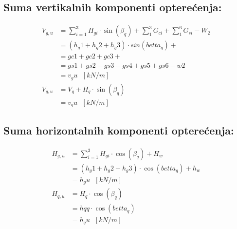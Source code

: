 \documentclass[a4paper, 11pt]{article}
\begin{document}
\subsection*{Suma vertikalnih komponenti optere\'cenja:}

\begin{align*}
V_{g,u} &= \sum_{i=1}^{3} H_{gi} \cdot \sin(\beta_{q}) + \sum_{1}^3 {G_{ci}} + \sum_{1}^{6} {G_{si}} -W_{2} \\
		&= \left( h_g1 + h_g2 + h_g3 \right) \cdot sin(betta_q)+  \\
		&= gc1+gc2+gc3 + \\
		&= gs1+gs2+gs3+gs4+gs5+gs6 - w2 \\
		&= v_gu \text{ } [kN/m] \\
V_{q,u} &= V_{q} + H_{q} \cdot \sin(\beta_{q}) \\
		&= v_qu \text{ } [kN/m]
\end{align*}

\subsection*{Suma horizontalnih komponenti optere\'cenja:}

\begin{align*}
H_{g,u} &= \sum_{i=1}^{3} H_{gi} \cdot \cos(\beta_{q}) + H_{w} \\
		&=  \left( h_g1 + h_g2 + h_g3 \right) \cdot \cos (betta_q) + h_w \\
		&= h_gu \text{ } [kN/m] \\
H_{q,u} &= H_{q} \cdot \cos (\beta_{q}) \\
		&= hqq \cdot \cos (betta_q) \\
		&= h_qu \text{ } [kN/m]
\end{align*}
\end{document}
